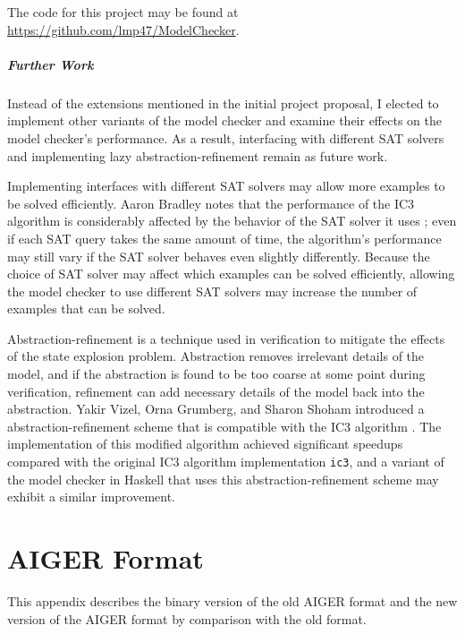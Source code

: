 \documentclass[12pt,a4paper,twoside,openright]{report}
\begin{document}
{{The code for this project may be found at \url{https://github.com/lmp47/ModelChecker}.

\paragraph{Further Work}{
Instead of the extensions mentioned in the initial project proposal,
I elected to implement other variants of the model checker and examine their
effects on the model checker's performance.
As a result, interfacing with different SAT solvers and implementing lazy
abstraction-refinement remain as future work.

Implementing interfaces with different SAT solvers may allow more examples to be solved efficiently.
Aaron Bradley notes that the performance of the IC3 algorithm is considerably affected
by the behavior of the SAT solver it uses \cite{bradley12}; even if each SAT query takes the same amount of
time, the algorithm's performance may still vary if the SAT solver behaves even slightly differently.
Because the choice of SAT solver may affect which examples can be solved efficiently, allowing the model
checker to use different SAT solvers may increase the number of examples that can be solved.

Abstraction-refinement is a technique used in verification to mitigate the effects
of the state explosion problem. Abstraction removes irrelevant details of the model,
and if the abstraction is found to be too coarse at some point during verification,
refinement can add necessary details of the model back into the abstraction.
Yakir Vizel, Orna Grumberg, and Sharon Shoham introduced a abstraction-refinement
scheme that is compatible with the IC3 algorithm \cite{vizel12}. The implementation
of this modified algorithm achieved significant speedups compared with the
original IC3 algorithm implementation \verb,ic3,, and a variant
of the model checker in Haskell that uses this abstraction-refinement scheme may 
exhibit a similar improvement.}



\appendix

\chapter{AIGER Format}
\label{aiger}
This appendix describes the binary version of the old AIGER format
and the new version of the AIGER format by
comparison with the old format.

}}
\end{document}

